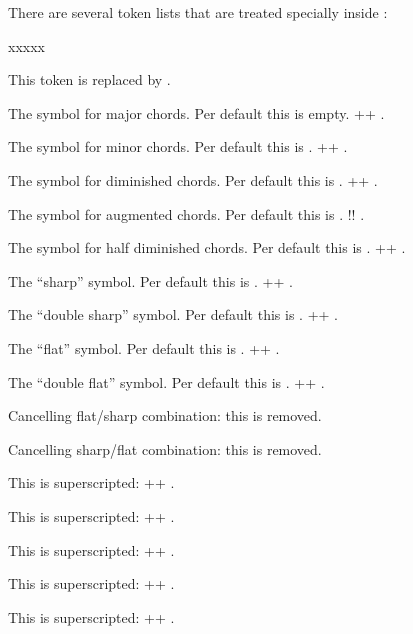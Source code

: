 \documentclass[load-preamble+]{cnltx-doc}
\begin{document}
There are several token lists that are treated specially inside :
\begin{labeling}[--]{xxxxx}
  \item[\code{\^{}}] This token is replaced by .
  \item[\code{ma}] The symbol for major chords.  Per default this is
    empty. \verbcode++ .
  \item[\code{mi}] The symbol for minor chords.  Per default this is
    .  \verbcode++ .
  \item[\code{o}] The symbol for diminished chords.  Per default this is
    .  \verbcode++
    .
  \item[\code{+}] The symbol for augmented chords.  Per default this is
    .  \verbcode!!
    .
  \item[\code{/o}] The symbol for half diminished chords.  Per default
    this is .
    \verbcode++ .
  \item[\code{\#}] The \enquote{sharp} symbol.  Per default this is
    .  \verbcode++ .
  \item[\code{\#\#}] The \enquote{double sharp} symbol.  Per default this is
    .  \verbcode++ .
  \item[\code{b}] The \enquote{flat} symbol.  Per default this is
    .  \verbcode++ .
  \item[\code{bb}] The \enquote{double flat} symbol.  Per default this is
    .  \verbcode++ .
  \item[\code{b\#}] Cancelling flat/sharp combination: this is removed.
  \item[\code{\#b}] Cancelling sharp/flat combination: this is removed.
  \item[\code{add}] This is superscripted: \verbcode++
    .
  \item[\code{sus}] This is superscripted: \verbcode++
    .
  \item[\code{dim}] This is superscripted: \verbcode++
    .
  \item[\code{maj7}] This is superscripted: \verbcode++
    .
  \item[\code{maj9}] This is superscripted: \verbcode++
    .
\end{labeling}
\end{document}
